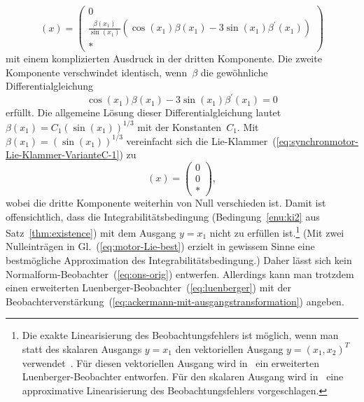 \begin{equation}
[\ad_{-f}v,\ad_{-f}^{2}v](x)=\left(\begin{array}{c}
0\\
\frac{\beta(x_{1})}{\sin(x_{1})}\left(\cos(x_{1})\beta(x_{1})-3\sin(x_{1})\beta^{\prime}(x_{1})\right)\\
*
\end{array}\right)\label{eq:synchronmotor-Lie-Klammer-VarianteC-1}
\end{equation}
mit einem komplizierten Ausdruck in der dritten Komponente. Die zweite
Komponente verschwindet identisch, wenn~$\beta$ die gewöhnliche
Differentialgleichung 
\[
\cos(x_{1})\beta(x_{1})-3\sin(x_{1})\beta^{\prime}(x_{1})=0
\]
erfüllt. Die allgemeine Lösung dieser Differentialgleichung lautet
$\beta(x_{1})=C_{1}(\sin(x_{1}))^{1/3}$ mit der Konstanten~$C_{1}$.
Mit $\beta(x_{1})=(\sin(x_{1}))^{1/3}$ vereinfacht sich die Lie-Klammer~(\ref{eq:synchronmotor-Lie-Klammer-VarianteC-1})
zu 
\begin{equation}
[\ad_{-f}v,\ad_{-f}^{2}v](x)=\left(\begin{array}{c}
0\\
0\\
*
\end{array}\right),\label{eq:motor-Lie-best}
\end{equation}
wobei die dritte Komponente weiterhin von Null verschieden ist. Damit
ist offensichtlich, dass die Integrabilitätsbedingung (Bedingung~\ref{enu:ki2}
aus Satz~\ref{thm:existence}) mit dem Ausgang $y=x_{1}$ nicht zu
erfüllen ist.\footnote{Die exakte Linearisierung des Beobachtungsfehlers ist möglich, wenn
man statt des skalaren Ausgangs $y=x_{1}$ den vektoriellen Ausgang
$y=(x_{1},x_{2})^{T}$ verwendet~\cite{keller86diss}. Für diesen
vektoriellen Ausgang wird in~\cite{birk88} ein erweiterten Luenberger-Beobachter
entworfen. Für den skalaren Ausgang wird in~\cite{roebenack2013wseas}
eine approximative Linearisierung des Beobachtungsfehlers vorgeschlagen.} (Mit zwei Null\-ein\-trägen in Gl.~(\ref{eq:motor-Lie-best})
erzielt in gewissem Sinne eine bestmögliche Approximation des Integrabilitätsbedingung.)
Daher lässt sich kein Normalform-Beobachter~(\ref{eq:ons-orig})
entwerfen. Allerdings kann man trotzdem einen erweiterten Luenberger-Beobachter~(\ref{eq:luenberger})
mit der Beobachterverstärkung~(\ref{eq:ackermann-mit-ausgangstransformation})
angeben. 

